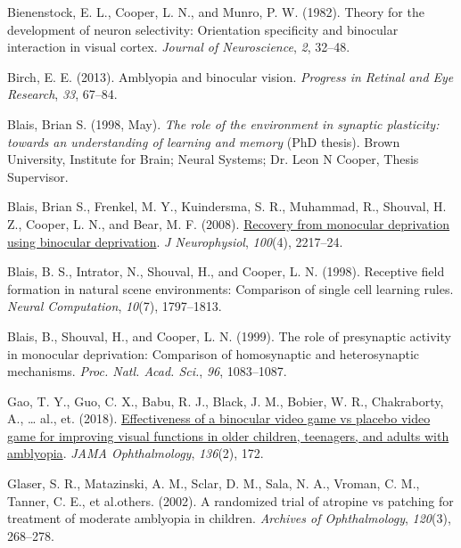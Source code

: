 \documentclass[
  onecolumn]{article}
\newlength{\cslhangindent}
\newenvironment{CSLReferences}[2] %
 {%
  \setlength{\parindent}{0pt}
  \ifodd #1 \everypar{\setlength{\hangindent}{\cslhangindent}}\ignorespaces\fi
  \ifnum #2 > 0
  \setlength{\parskip}{#2\baselineskip}
  \fi
 }%
 {}
\begin{document}
\hypertarget{refs}{}
\begin{CSLReferences}{1}{0}
\leavevmode{}%
Bienenstock, E. L., Cooper, L. N., and Munro, P. W. (1982). Theory for
the development of neuron selectivity: Orientation specificity and
binocular interaction in visual cortex. \emph{Journal of Neuroscience},
\emph{2}, 32--48.

\leavevmode{}%
Birch, E. E. (2013). Amblyopia and binocular vision. \emph{Progress in
Retinal and Eye Research}, \emph{33}, 67--84.

\leavevmode{}%
Blais, Brian S. (1998, May). \emph{The role of the environment in
synaptic plasticity:\\
towards an understanding of learning and memory} (PhD thesis). Brown
University, Institute for Brain; Neural Systems; Dr. Leon N Cooper,
Thesis Supervisor.

\leavevmode{}%
Blais, Brian S., Frenkel, M. Y., Kuindersma, S. R., Muhammad, R.,
Shouval, H. Z., Cooper, L. N., and Bear, M. F. (2008).
\href{https://doi.org/10.1152/jn.90411.2008}{Recovery from monocular
deprivation using binocular deprivation}. \emph{J Neurophysiol},
\emph{100}(4), 2217--24.

\leavevmode{}%
Blais, B. S., Intrator, N., Shouval, H., and Cooper, L. N. (1998).
Receptive field formation in natural scene environments: Comparison of
single cell learning rules. \emph{Neural Computation}, \emph{10}(7),
1797--1813.

\leavevmode{}%
Blais, B., Shouval, H., and Cooper, L. N. (1999). The role of
presynaptic activity in monocular deprivation: Comparison of
homosynaptic and heterosynaptic mechanisms. \emph{Proc. Natl. Acad.
Sci.}, \emph{96}, 1083--1087.

\leavevmode{}%
Gao, T. Y., Guo, C. X., Babu, R. J., Black, J. M., Bobier, W. R.,
Chakraborty, A., \ldots{} al., et. (2018).
\href{https://doi.org/10.1001/jamaophthalmol.2017.6090}{Effectiveness of
a binocular video game vs placebo video game for improving visual
functions in older children, teenagers, and adults with amblyopia}.
\emph{JAMA Ophthalmology}, \emph{136}(2), 172.

\leavevmode{}%
Glaser, S. R., Matazinski, A. M., Sclar, D. M., Sala, N. A., Vroman, C.
M., Tanner, C. E., et al.others. (2002). A randomized trial of atropine
vs patching for treatment of moderate amblyopia in children.
\emph{Archives of Ophthalmology}, \emph{120}(3), 268--278.


\end{CSLReferences}
\end{document}
